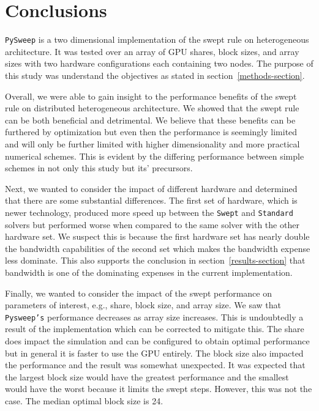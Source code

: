 \documentclass[review]{elsarticle}
\def\pysweep{\texttt{PySweep}}
\def\Swept{\texttt{Swept}}
\def\Standard{\texttt{Standard}}
\begin{document}
\section{Conclusions}
\label{conclusions-section}
\pysweep{} is a two dimensional implementation of the swept rule on heterogeneous architecture. It was tested over an array of GPU shares, block sizes, and array sizes with two hardware configurations each containing two nodes. The purpose of this study was understand the objectives as stated in section~\ref{methods-section}.

Overall, we were able to gain insight to the performance benefits of the swept rule on distributed heterogeneous architecture. We showed that the swept rule can be both beneficial and detrimental. We believe that these benefits can be furthered by optimization but even then the performance is seemingly limited and will only be further limited with higher dimensionality and more practical numerical schemes. This is evident by the differing performance between simple schemes in not only this study but its' precursors.

Next, we wanted to consider the impact of different hardware and determined that there are some substantial differences. The first set of hardware, which is newer technology, produced more speed up between the \Swept{} and \Standard{} solvers but performed worse when compared to the same solver with the other hardware set. We suspect this is because the first hardware set has nearly double the bandwidth capabilities of the second set which makes the bandwidth expense less dominate. This also supports the conclusion in section~\ref{results-section} that bandwidth is one of the dominating expenses in the current implementation.

Finally, we wanted to consider the impact of the swept performance on parameters of interest, e.g., share, block size, and array size. We saw that \texttt{Pysweep's} performance decreases as array size increases. This is undoubtedly a result of the implementation which can be corrected to mitigate this. The share does impact the simulation and can be configured to obtain optimal performance but in general it is faster to use the GPU entirely. The block size also impacted the performance and the result was somewhat unexpected. It was expected that the largest block size would have the greatest performance and the smallest would have the worst because it limits the swept steps. However, this was not the case. The median optimal block size is 24. 
\end{document}
